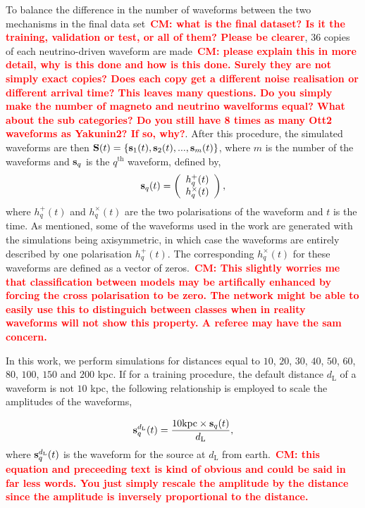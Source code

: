 \documentclass[aps,twocolumn,showpacs,groupedaddress, nofootinbib]{revtex4}  %
\newcommand{\cm}[1]{\textbf{\textcolor{red}{CM: #1}}}
\begin{document}
%
%
To balance the difference in the number of waveforms between the two mechanisms
in the final data set~\cm{what is the final dataset? Is it the training,
validation or test, or all of them? Please be clearer}, $36$ copies of each neutrino-driven waveform are
made~\cm{please explain this in more detail, why is this done and how is this
done. Surely they are not simply exact copies? Does each copy get a different
noise realisation or different arrival time? This leaves many questions. Do
you simply make the number of magneto and neutrino wavelforms equal? What about
the sub categories? Do you still have 8 times as many Ott2 waveforms as
Yakunin2? If so, why?}. After this procedure, the
simulated waveforms are then $\bold{S}(t) = \{\bold{s}_{1}(t), \bold{s}_{2}(t),
..., \bold{s}_{m}(t)\}$, where $m$ is the number of the waveforms and
$\bold{s}_{q}$ is the $q^{\text{th}}$ waveform, defined by, 
%
\begin{equation}\label{eq:ht}
\bold{s}_q(t) = \left(\begin{array}{c} h_q^+(t) \\ h_q^\times(t)
\end{array}\right), 
\end{equation} 
%
where $h_q^+(t)$ and $h_q^\times(t)$ are the two polarisations of the waveform
and $t$ is the time. As mentioned, some of the waveforms used in the work are
generated with the simulations being axisymmetric, in which case the waveforms
are entirely described by one polarisation $h_q^+(t)$. The corresponding
$h_q^\times(t)$ for these waveforms are defined as a vector of zeros.~\cm{This
slightly worries me that classification between models may be artifically
enhanced by forcing the cross polarisation to be zero. The network might be
able to easily use this to distinguich between classes when in reality
waveforms will not show this property. A referee may have the sam concern.} 

%
%
In this work, we perform simulations for distances equal to $10$, $20$, $30$,
$40$, $50$, $60$, $80$, $100$, $150$ and $200$ kpc. If for a training
procedure, the default distance $d_\text{L}$ of a waveform is not $10$ kpc, the
following relationship is employed to scale the amplitudes of the waveforms,

\begin{equation}\label{eq:sap} 
\bold{s}^{d_\text{L}}_q(t) =
\frac{10\text{kpc}\times\bold{s}_q(t)}{d_\text{L}}, 
\end{equation} 
%
where $\bold{s}^{d_\text{L}}_q(t)$ is the waveform for the source at $d_\text{L}$
from earth.~\cm{this equation and preceeding text is kind of obvious and could
be said in far less words. You just simply rescale the amplitude by the
distance since the amplitude is inversely proportional to the distance.}
\end{document}
